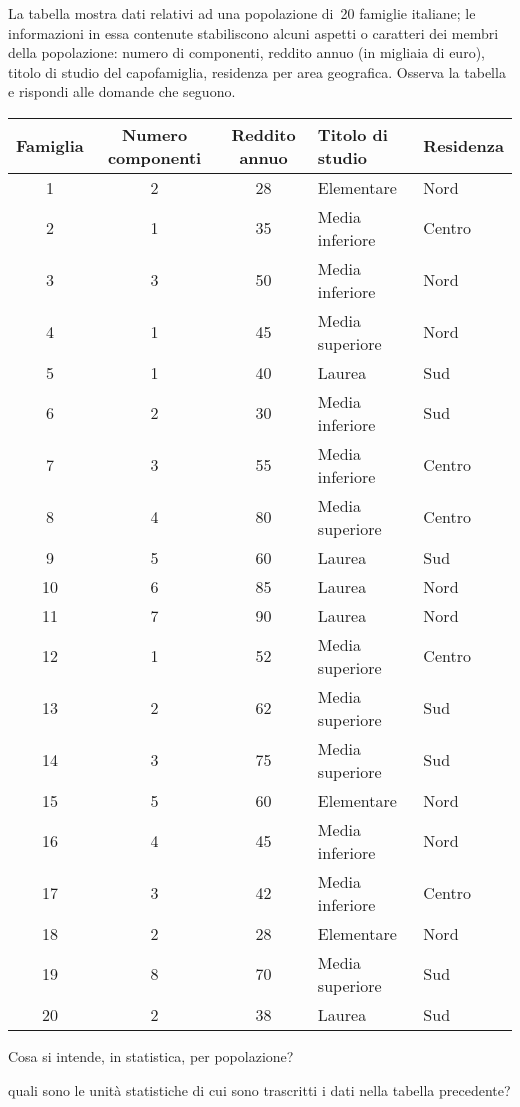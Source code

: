 \begin{esercizio}
\label{ese:A.9}
La tabella mostra dati relativi ad una popolazione di~20 famiglie italiane; le informazioni in essa contenute stabiliscono alcuni aspetti o caratteri
dei membri della popolazione: numero di componenti, reddito annuo (in migliaia di euro), titolo di studio del capofamiglia, residenza per area geografica.
Osserva la tabella e rispondi alle domande che seguono.
\begin{center}
 \begin{tabular}{cccll}
\toprule
Famiglia & Numero componenti & Reddito annuo & Titolo di studio & Residenza\\
\midrule
1 & 2 & 28 & Elementare & Nord \\
2 & 1 & 35 & Media inferiore & Centro \\
3 & 3 & 50 & Media inferiore & Nord \\
4 & 1 & 45 & Media superiore & Nord \\
5 & 1 & 40 & Laurea & Sud \\
6 & 2 & 30 & Media inferiore & Sud \\
7 & 3 & 55 & Media inferiore & Centro \\
8 & 4 & 80 & Media superiore & Centro \\
9 & 5 & 60 & Laurea & Sud \\
10 & 6 & 85 & Laurea & Nord \\
11 & 7 & 90 & Laurea & Nord \\
12 & 1 & 52 & Media superiore & Centro \\
13 & 2 & 62 & Media superiore & Sud \\
14 & 3 & 75 & Media superiore & Sud \\
15 & 5 & 60 & Elementare & Nord\\
16 & 4 & 45 & Media inferiore & Nord \\
17 & 3 & 42 & Media inferiore & Centro \\
18 & 2 & 28 & Elementare & Nord \\
19 & 8 & 70 & Media superiore & Sud \\
20 & 2 & 38 & Laurea & Sud \\
\bottomrule
\end{tabular}
\end{center}
\begin{itemize*}
\item Cosa si intende, in statistica, per popolazione?
\item quali sono le unità statistiche di cui sono trascritti i dati nella tabella precedente?

\end{itemize*}
\end{esercizio}

